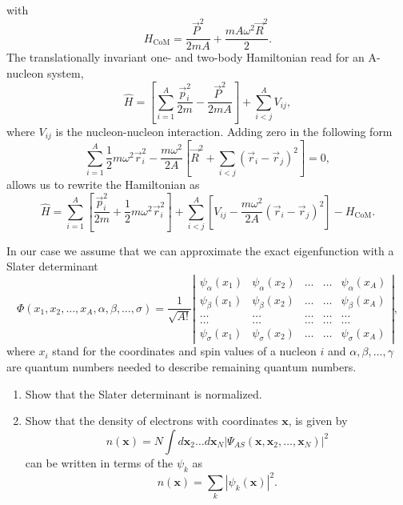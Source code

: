  with
 \[
      H_{\mathrm{CoM}}=
      \frac{\vec{P}^2}{2mA}+\frac{mA\omega^2\vec{R}^2}{2}.
 \]
 The translationally invariant one- and two-body Hamiltonian read for
 an A-nucleon system, %
 \[\label{eq:ham}
\hat{H}=\left[\sum_{i=1}^A\frac{\vec{p}_i^2}{2m}-\frac{\vec{P}^2}{2mA}\right] +\sum_{i<j}^A V_{ij},
 \]
 where $V_{ij}$ is the nucleon-nucleon interaction. Adding zero in the following form
 \[
 \sum_{i=1}^A\frac{1}{2}m\omega^2\vec{r}_i^2-
 \frac{m\omega^2}{2A}\left[\vec{R}^2+\sum_{i<j}(\vec{r}_i-\vec{r}_j)^2\right]=0,
 \]
allows us to rewrite the Hamiltonian as
 \[
 \hat{H}=\sum_{i=1}^A \left[ \frac{\vec{p}_i^2}{2m}
   +\frac{1}{2}m\omega^2 \vec{r}^2_i \right] + \sum_{i<j}^A \left[
   V_{ij}-\frac{m\omega^2}{2A} (\vec{r}_i-\vec{r}_j)^2 \right]-H_{\mathrm{CoM}}.
 \]


In our case we assume that we can approximate the exact eigenfunction
with a Slater determinant 
\begin{equation} 
\Phi(x_1, x_2,\dots,x_A,\alpha,\beta,\dots, \sigma)=\frac{1}{\sqrt{A!}}
\left| \begin{array}{ccccc} \psi_{\alpha}(x_1)& \psi_{\alpha}(x_2)&
  \dots & \dots &
  \psi_{\alpha}(x_A)\\ \psi_{\beta}(x_1)&\psi_{\beta}(x_2)& \dots &
  \dots & \psi_{\beta}(x_A)\\ \dots & \dots & \dots & \dots & \dots
  \\ \dots & \dots & \dots & \dots & \dots
  \\ \psi_{\sigma}(x_1)&\psi_{\sigma}(x_2)& \dots & \dots &
  \psi_{\sigma}(x_A)\end{array} \right|,
\label{HartreeFockDet}
\end{equation} 
where $x_i$ stand for the coordinates and spin values of a nucleon
$i$ and $\alpha,\beta,\dots, \gamma$ are quantum numbers needed to
describe remaining quantum numbers.
\begin{enumerate}
 \item Show that the Slater determinant is normalized.
 \item Show that the density of electrons with coordinates
   $\mathbf{x}$, is given by
 \begin{equation}
  n(\mathbf{x}) = N \int d\mathbf{x}_2 \dots d\mathbf{x}_N
  |\Psi_{AS}(\mathbf{x},\mathbf{x}_2,\dots,\mathbf{x}_N)|^2
\end{equation}
can be written in terms of the $\psi_k$ as
\begin{equation}
 n(\mathbf{x}) = \sum_k|\psi_k(\mathbf{x})|^2.
\end{equation}
\end{enumerate}



